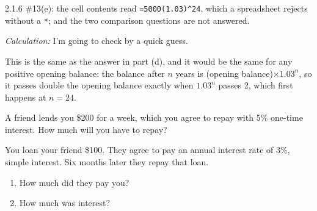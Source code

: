 \begin{sol}
 \begin{corr}{2.1.6 \#13(e): the cell contents read \texttt{=5000(1.03)\textasciicircum 24}, which a spreadsheet rejects without a \texttt{*}; and the two comparison questions are not answered.}%
\end{corr}



\textit{Calculation:} I'm going to check by a quick guess.


This is the same as the answer in part (d), and it would be the same for any positive opening balance: the balance after $n$ years is (opening balance)$\times 1.03^n$, so it passes double the opening balance exactly when $1.03^n$ passes 2, which first happens at $n = 24$.
\end{sol}



\begin{stmt}
A friend lends you \$200 for a week, which you agree to repay with 5\% one-time interest. How much will you have to repay?
\end{stmt}

\begin{sol}

\end{sol}


\begin{stmt}
You loan your friend \$100. They agree to pay an annual interest rate of 3\%, simple interest. Six months later they repay that loan.
\begin{enumerate}[label=(\alph*), leftmargin=2em, topsep=2pt, itemsep=1pt]
\item How much did they pay you?
\item How much was interest?
\end{enumerate}
\end{stmt}

